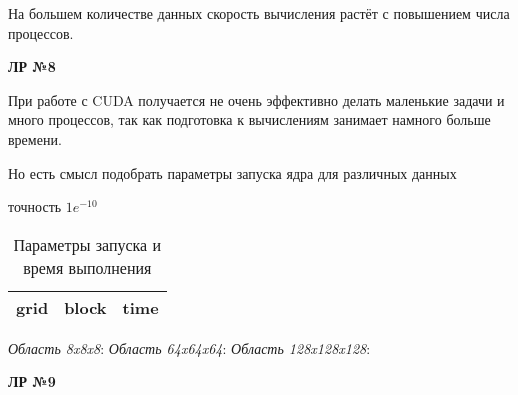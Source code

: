\documentclass[12pt]{article}
\begin{document}
На большем количестве данных скорость вычисления растёт с повышением числа процессов.

\textbf{ЛР №8}

При работе с CUDA получается не очень эффективно делать маленькие задачи и много процессов,
так как подготовка к вычислениям занимает намного больше времени.

Но есть смысл подобрать параметры запуска ядра для различных данных

\begin{table*}[!ht]
	\centering
	\caption*{Параметры запуска и время выполнения}
	точность $1e^{-10}$
	\begin{tabularx}{\linewidth}{|X|X|X|}
		\hline
		grid & block & time \\
		\hline
		\hline
	\end{tabularx}
\end{table*}


\textit{Область 8x8x8}:
\textit{Область 64x64x64}:
\textit{Область 128x128x128}:

\textbf{ЛР №9}
\end{document}
